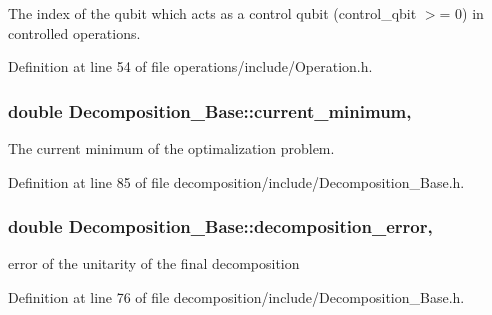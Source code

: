 The index of the qubit which acts as a control qubit (control\+\_\+qbit $>$= 0) in controlled operations. 



Definition at line 54 of file operations/include/\+Operation.\+h.

\subsubsection[{\texorpdfstring{current\+\_\+minimum}{current_minimum}}]{\setlength{\rightskip}{0pt plus 5cm}double Decomposition\+\_\+\+Base\+::current\+\_\+minimum\hspace{0.3cm}{\ttfamily [protected]}, {\ttfamily [inherited]}}\hypertarget{class_decomposition___base_a7a8a6050c20f7965286792493a55d877}{}\label{class_decomposition___base_a7a8a6050c20f7965286792493a55d877}


The current minimum of the optimalization problem. 



Definition at line 85 of file decomposition/include/\+Decomposition\+\_\+\+Base.\+h.

\subsubsection[{\texorpdfstring{decomposition\+\_\+error}{decomposition_error}}]{\setlength{\rightskip}{0pt plus 5cm}double Decomposition\+\_\+\+Base\+::decomposition\+\_\+error\hspace{0.3cm}{\ttfamily [protected]}, {\ttfamily [inherited]}}\hypertarget{class_decomposition___base_a9b181a78ecfd103c9b233ddafa2defdd}{}\label{class_decomposition___base_a9b181a78ecfd103c9b233ddafa2defdd}


error of the unitarity of the final decomposition 



Definition at line 76 of file decomposition/include/\+Decomposition\+\_\+\+Base.\+h.

